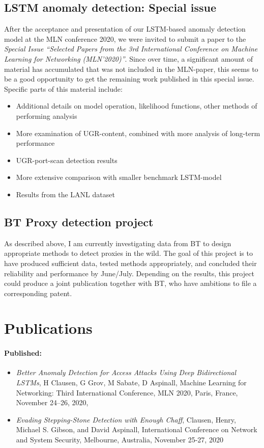 \documentclass[a4paper,12pt,twoside]{article}
\begin{document}
\subsection{LSTM anomaly detection: Special issue}

After the acceptance and presentation of our LSTM-based anomaly detection model at the MLN conference 2020, we were invited to submit a paper to the \textit{Special Issue ``Selected Papers from the 3rd International Conference on Machine Learning for Networking (MLN'2020)''}. Since over time, a significant amount of material has accumulated that was not included in the MLN-paper, this seems to be a good opportunity to get the remaining work published in this special issue. Specific parts of this material include:
\begin{itemize}
\item Additional details on model operation, likelihood functions, other methods of performing analysis
\item More examination of UGR-content, combined with more analysis of long-term performance
\item UGR-port-scan detection results
\item More extensive comparison with smaller benchmark LSTM-model
\item Results from the LANL dataset
\end{itemize}


\subsection{BT Proxy detection project}
As described above, I am currently investigating data from BT to design appropriate methods to detect proxies in the wild. The goal of this project is to have produced sufficient data, tested methods appropriately, and concluded their reliability and performance by June/July. Depending on the results, this project could produce a joint publication together with BT, who have ambitions to file a corresponding patent.

\section{Publications}

\paragraph{Published:}
\begin{itemize}
\item \textit{Better Anomaly Detection for Access Attacks Using Deep Bidirectional LSTMs}, H Clausen, G Grov, M Sabate, D Aspinall, Machine Learning for Networking: Third International Conference, MLN 2020, Paris, France, November 24–26, 2020,
\item \textit{Evading Stepping-Stone Detection with Enough Chaff}, Clausen, Henry, Michael S. Gibson, and David Aspinall, International Conference on Network and System Security, Melbourne, Australia, November 25-27, 2020
\end{itemize}
\end{document}

